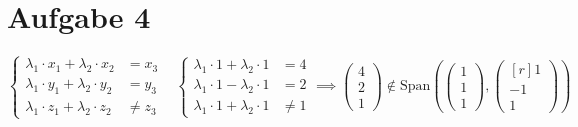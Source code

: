 \section{Aufgabe 4}

$\begin{cases}
    \lambda_1 \cdot x_1 + \lambda_2 \cdot x_2 &= x_3 \\
    \lambda_1 \cdot y_1 + \lambda_2 \cdot y_2 &= y_3 \\
    \lambda_1 \cdot z_1 + \lambda_2 \cdot z_2 &\neq z_3
\end{cases}
\hspace{10pt}
\begin{cases}
    \lambda_1 \cdot 1 + \lambda_2 \cdot 1 &= 4 \\
    \lambda_1 \cdot 1 - \lambda_2 \cdot 1 &= 2 \\
    \lambda_1 \cdot 1 + \lambda_2 \cdot 1 &\neq 1
\end{cases}
\implies
\begin{pmatrix}
    4 \\ 2 \\ 1
\end{pmatrix}
\notin
\text{Span}\left(
    \begin{pmatrix}
        1 \\ 1 \\ 1
    \end{pmatrix},
    \begin{pmatrix*}[r]
        1 \\ -1 \\ 1
    \end{pmatrix*}
\right)$
